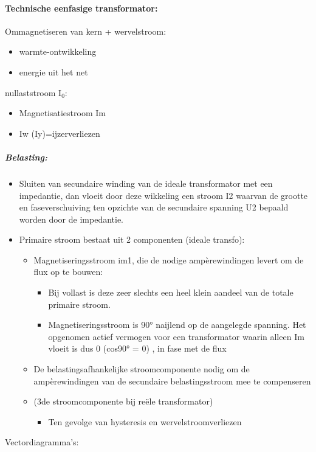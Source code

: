 \documentclass[12pt]{article}
\begin{document}
\paragraph{Technische eenfasige transformator:}
Ommagnetiseren van kern + wervelstroom:\begin{itemize}
    \item warmte-ontwikkeling 
    \item energie uit het net 
\end{itemize}
nullaststroom I$_0$:\begin{itemize}
    \item Magnetisatiestroom Im 
    \item Iw (Iy)=ijzerverliezen
\end{itemize}
\subparagraph{Belasting:}
\begin{itemize}
    \item Sluiten van secundaire winding van de ideale transformator met een impedantie, dan vloeit door deze wikkeling een stroom I2 waarvan de grootte en faseverschuiving ten opzichte van de secundaire spanning U2 bepaald worden door de impedantie.
    \item Primaire stroom bestaat uit 2 componenten (ideale transfo):\begin{itemize}
        \item Magnetiseringsstroom im1, die de nodige ampèrewindingen levert om de flux op te bouwen:\begin{itemize}
            \item Bij vollast is deze zeer slechts een heel klein aandeel van de totale primaire stroom.
            \item Magnetiseringsstroom is 90° naijlend op de aangelegde spanning. Het opgenomen actief vermogen voor een transformator waarin alleen Im vloeit is dus 0 (cos90° = 0) , in fase met de flux
        \end{itemize}
        \item De belastingsafhankelijke stroomcomponente nodig om de ampèrewindingen van de secundaire belastingsstroom mee te compenseren
        \item (3de stroomcomponente bij reële transformator)\begin{itemize}
            \item Ten gevolge van hysteresis en wervelstroomverliezen
        \end{itemize}
    \end{itemize}
\end{itemize}
Vectordiagramma's:%
\end{document}
